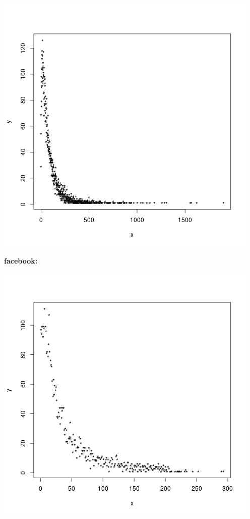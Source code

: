 \documentclass[palatino,nochap]{apuntes}
\begin{document}
\begin{center}
	\includegraphics[scale=0.45]{img/twitter_grado}
\end{center}


\textbf{facebook:}

\begin{center}
	\includegraphics[scale=0.45]{img/fb_grado}
\end{center}
\end{document}

